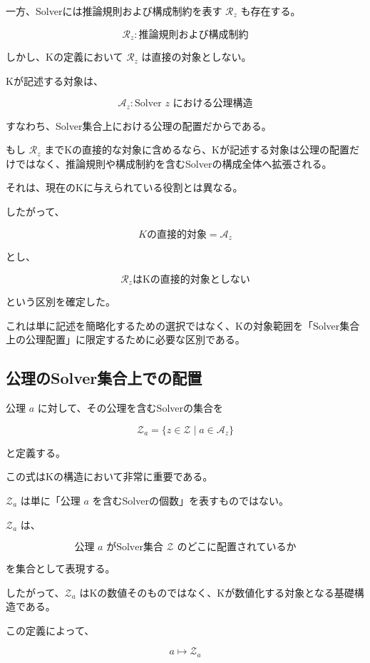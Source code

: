 一方、Solverには推論規則および構成制約を表す $\mathcal{R}_z$ も存在する。

\[
\mathcal{R}_z :
\text{推論規則および構成制約}
\]

しかし、Kの定義において $\mathcal{R}_z$ は直接の対象としない。

Kが記述する対象は、

\[
\mathcal{A}_z :
\text{Solver }z\text{ における公理構造}
\]

すなわち、Solver集合上における公理の配置だからである。

もし $\mathcal{R}_z$ までKの直接的な対象に含めるなら、Kが記述する対象は公理の配置だけではなく、推論規則や構成制約を含むSolverの構成全体へ拡張される。

それは、現在のKに与えられている役割とは異なる。

したがって、

\[
\boxed{
K\text{の直接的対象}=\mathcal{A}_z
}
\]

とし、

\[
\boxed{
\mathcal{R}_z\text{はKの直接的対象としない}
}
\]

という区別を確定した。

これは単に記述を簡略化するための選択ではなく、Kの対象範囲を「Solver集合上の公理配置」に限定するために必要な区別である。

\subsection{公理のSolver集合上での配置}

公理 $a$ に対して、その公理を含むSolverの集合を

\[
\boxed{
\mathcal{Z}_a = \{z\in\mathcal{Z}\mid a\in\mathcal{A}_z\}
}
\]

と定義する。

この式はKの構造において非常に重要である。

$\mathcal{Z}_a$ は単に「公理 $a$ を含むSolverの個数」を表すものではない。

$\mathcal{Z}_a$ は、

\[
\boxed{
\text{公理 }a\text{ がSolver集合 }\mathcal{Z}\text{ のどこに配置されているか}
}
\]

を集合として表現する。

したがって、$\mathcal{Z}_a$ はKの数値そのものではなく、Kが数値化する対象となる基礎構造である。

この定義によって、

\[
a
\longmapsto
\mathcal{Z}_a
\]

